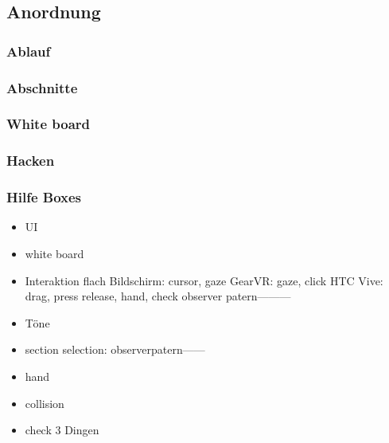  \subsection{Anordnung}
  \subsubsection{Ablauf}
  
  \subsubsection{Abschnitte}
  
  \subsubsection{White board}
  
  \subsubsection{Hacken}
  
  \subsubsection{Hilfe Boxes}
  
\begin{itemize}
\item UI
\item white board
\item Interaktion
\subitem flach Bildschirm: cursor, gaze
\subitem GearVR: gaze, click
\subitem HTC Vive: drag, press release, hand, check
\subitem observer patern---------
\item Töne
\item section selection: observerpatern------
\item hand
\item collision
\item check 3 Dingen
\end{itemize}